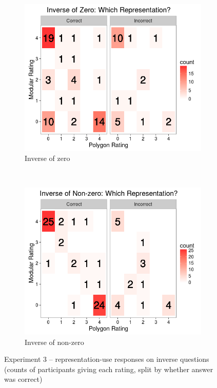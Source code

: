 \documentclass[man,mask,10pt]{apa6}
\begin{document}
\begin{figure}
\centering
\begin{subfigure}[c]{0.45\textwidth}
\centering 
\includegraphics[width=\textwidth]{figures/3/wr_inZ.png}
\caption{Inverse of zero}
\end{subfigure}
~
\begin{subfigure}[c]{0.45\textwidth}
\centering 
\includegraphics[width=\textwidth]{figures/3/wr_inNZ.png}
\caption{Inverse of non-zero}
\end{subfigure}
\caption{Experiment 3 -- representation-use responses on inverse questions (counts of participants giving each rating, split by whether answer was correct)}
\label{ex3_wr_in}
\end{figure}\noindent
\end{document}
